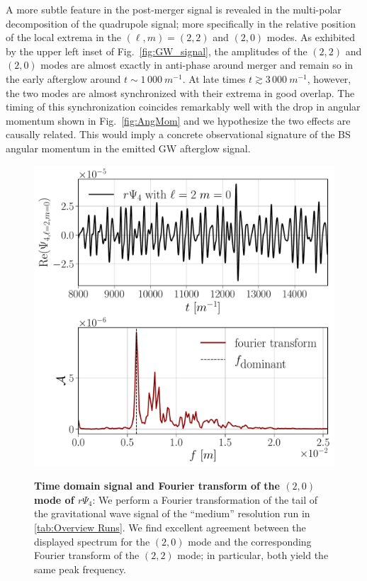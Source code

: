 \documentclass[aps,twocolumn,nofootinbib,superscriptaddress,amsfonts,floatfix
]{revtex4-1} %
\begin{document}
A more subtle feature in the post-merger signal is revealed in
the multi-polar decomposition of the quadrupole signal;
more specifically in the relative position of the local extrema
in the $(\ell,m)=(2,2)$ and $(2,0)$ modes. As exhibited by
the upper left inset of Fig.~\ref{fig:GW_signal}, the amplitudes
of the $(2,2)$ and $(2,0)$ modes are almost exactly
in anti-phase around merger and remain so in the early afterglow
around $t\sim 1\,000~m^{-1}$. At late times
$t\gtrsim 3\,000~m^{-1}$, however, the
two modes are almost synchronized with their extrema
in good overlap.
The timing of this synchronization coincides remarkably well
with the drop in angular momentum shown in Fig.~\ref{fig:AngMom}
and we hypothesize the two effects are causally related.
This would imply a concrete observational signature of the
BS angular momentum in the emitted GW afterglow signal.
\begin{figure}[t]
\begin{center}
{\includegraphics[width=1.0\columnwidth]{FFT_analysis.pdf}}
\caption{{\bf Time domain signal and
    Fourier transform of the $(2,0)$ mode
    of $r\Psi_4$}: We perform a Fourier
    transformation of the tail of the gravitational wave signal of the ``medium'' resolution run in \cref{tab:Overview Runs}.
    We find excellent agreement between the displayed
    spectrum for the $(2,0)$ mode and the corresponding Fourier transform of the $(2,2)$ mode; in particular, both yield the same peak frequency. 
    }
\label{fig:Fourier}
\end{center}
\end{figure}
 
\end{document}
